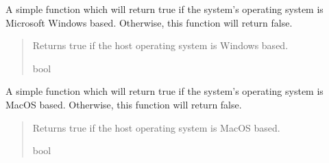 \documentclass[letterpaper,10pt,english]{sphinxmanual}
\begin{document}

\begin{fulllineitems}
\label{\detokenize{modules/util/system:qnav.util.system.is_window_platform}}
\pysigstartsignatures
{}
\pysigstopsignatures
\sphinxAtStartPar
A simple function which will return true if the system’s operating system
is Microsoft Windows based. Otherwise, this function will return false.
\begin{quote}\begin{description}
\sphinxAtStartPar
Returns true if the host operating system is Windows based.

\sphinxAtStartPar
bool

\end{description}\end{quote}

\end{fulllineitems}


\begin{fulllineitems}
\label{\detokenize{modules/util/system:qnav.util.system.is_mac_platform}}
\pysigstartsignatures
{}
\pysigstopsignatures
\sphinxAtStartPar
A simple function which will return true if the system’s operating system
is Mac\sphinxhyphen{}OS based. Otherwise, this function will return false.
\begin{quote}\begin{description}
\sphinxAtStartPar
Returns true if the host operating system is Mac\sphinxhyphen{}OS based.

\sphinxAtStartPar
bool

\end{description}\end{quote}

\end{fulllineitems}

\end{document}
